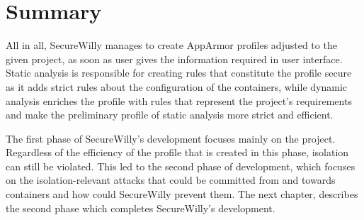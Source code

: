 \section{Summary}
All in all, SecureWilly manages to create AppArmor profiles adjusted to the given project, as soon as user gives the information required in user interface. Static analysis is responsible for creating rules that constitute the profile secure as it adds strict rules about the configuration of the containers, while dynamic analysis enriches the profile with rules that represent the project's requirements and make the preliminary profile of static analysis more strict and efficient.

The first phase of SecureWilly's development focuses mainly on the project. Regardless of the efficiency of the profile that is created in this phase, isolation can still be violated. This led to the second phase of development, which focuses on the isolation-relevant attacks that could be committed from and towards containers and how could SecureWilly prevent them. The next chapter, describes the second phase which completes SecureWilly's development.
